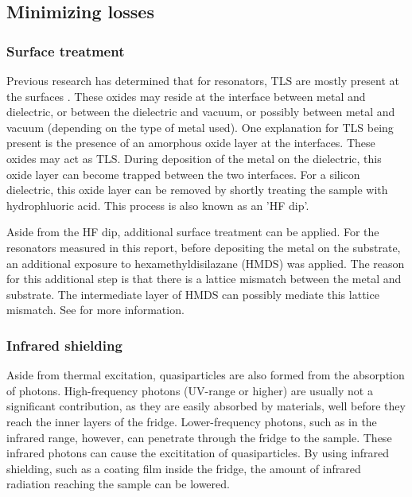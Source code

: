 \documentclass[12pt]{report}
\begin{document}
\subsection{Minimizing losses}

\subsubsection{Surface treatment}

Previous research has determined that for resonators, TLS are mostly present at the surfaces \cite{gao2008experimental}. These oxides may reside at the interface between metal and dielectric, or between the dielectric and vacuum, or possibly between metal and vacuum (depending on the type of metal used). One explanation for TLS being present is the presence of an amorphous oxide layer at the interfaces. These oxides may act as TLS. During deposition of the metal on the dielectric, this oxide layer can become trapped between the two interfaces. For a silicon dielectric, this oxide layer can be removed by shortly treating the sample with hydrophluoric acid. This process is also known as an 'HF dip'.

Aside from the HF dip, additional surface treatment can be applied. For the resonators measured in this report, before depositing the metal on the substrate, an additional exposure to hexamethyldisilazane (HMDS) was applied. The reason for this additional step is that there is a lattice mismatch between the metal and substrate. The intermediate layer of HMDS can possibly mediate this lattice mismatch. See \cite{DRIE} for more information.


\subsubsection{Infrared shielding}

Aside from thermal excitation, quasiparticles are also formed from the absorption of photons. High-frequency photons (UV-range or higher) are usually not a significant contribution, as they are easily absorbed by materials, well before they reach the inner layers of the fridge. Lower-frequency photons, such as in the infrared range, however, can penetrate through the fridge to the sample. These infrared photons can cause the excititation of quasiparticles. By using infrared shielding, such as a coating film inside the fridge, the amount of infrared radiation reaching the sample can be lowered.
\end{document}

